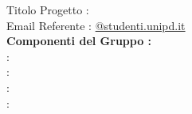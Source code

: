 \documentclass[12pt, a4paper,table]{article}
\title{\textsc{\docNome}}
\date{}
\begin{document}
	\maketitle
	\begin{center}
		
		Titolo Progetto : \huge{\titoloProgetto}
		\\
		\vspace{2em}
		\normalsize Email Referente :  \href{mailto:@studenti.unipd.it}{@studenti.unipd.it}\\
		
		\vspace{3em}
		\textbf{Componenti del Gruppo :}
		\vspace{0.5em}
		\\ \Tber : \MatT
		\vspace{0.5em}
		\\ \Mspa : \MatM
		\vspace{0.5em}
		\\ \Plau : \MatP
		\vspace{0.5em}
		\\ \Amat : \MatA
	\end{center}
	\newpage
	
	
	\newpage
	
	
	\newpage
	
	
	\newpage
	
	
	\newpage
	
	
	\newpage
	
	
	\newpage
	

  \newpage
	
\end{document}

